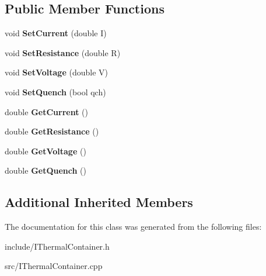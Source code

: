 \subsection*{Public Member Functions}
\begin{DoxyCompactItemize}
\item 
\hypertarget{class_i_electric_container_a14d16194ef3517f0ff1c0676a5867f1c}{}void {\bfseries Set\+Current} (double I)\label{class_i_electric_container_a14d16194ef3517f0ff1c0676a5867f1c}

\item 
\hypertarget{class_i_electric_container_a15be31a4510fd375da1168c1c3b51361}{}void {\bfseries Set\+Resistance} (double R)\label{class_i_electric_container_a15be31a4510fd375da1168c1c3b51361}

\item 
\hypertarget{class_i_electric_container_af6fd686727d3a8fd4b52dea69151e52d}{}void {\bfseries Set\+Voltage} (double V)\label{class_i_electric_container_af6fd686727d3a8fd4b52dea69151e52d}

\item 
\hypertarget{class_i_electric_container_a80342e41d229f27791f5ed772edb1a69}{}void {\bfseries Set\+Quench} (bool qch)\label{class_i_electric_container_a80342e41d229f27791f5ed772edb1a69}

\item 
\hypertarget{class_i_electric_container_a0b56c890659b9dbeff92678ef241ff37}{}double {\bfseries Get\+Current} ()\label{class_i_electric_container_a0b56c890659b9dbeff92678ef241ff37}

\item 
\hypertarget{class_i_electric_container_af1147c904d2a1621bfcd845e3d649bd9}{}double {\bfseries Get\+Resistance} ()\label{class_i_electric_container_af1147c904d2a1621bfcd845e3d649bd9}

\item 
\hypertarget{class_i_electric_container_aceb995cc2725bf0dce35bfc319a942a2}{}double {\bfseries Get\+Voltage} ()\label{class_i_electric_container_aceb995cc2725bf0dce35bfc319a942a2}

\item 
\hypertarget{class_i_electric_container_ae969320c452df488439823dd6cbc6228}{}double {\bfseries Get\+Quench} ()\label{class_i_electric_container_ae969320c452df488439823dd6cbc6228}

\end{DoxyCompactItemize}
\subsection*{Additional Inherited Members}


The documentation for this class was generated from the following files\+:\begin{DoxyCompactItemize}
\item 
include/I\+Thermal\+Container.\+h\item 
src/I\+Thermal\+Container.\+cpp\end{DoxyCompactItemize}
